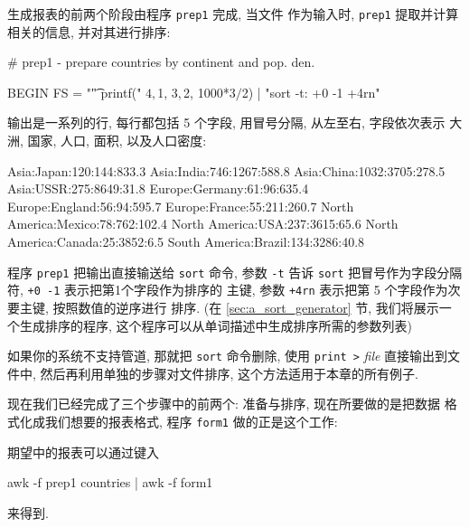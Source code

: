 生成报表的前两个阶段由程序 \verb'prep1' 完成, 当文件 
作为输入时, \verb'prep1' 提取并计算相关的信息, 并对其进行排序:
\begin{awkcode}
    # prep1 - prepare countries by continent and pop. den.

    BEGIN { FS = "\t" }
          { printf("%
                $4, $1, $3, $2, 1000*$3/$2) | "sort -t: +0 -1 +4rn"
          }
\end{awkcode}
输出是一系列的行, 每行都包括 5 个字段, 用冒号分隔, 从左至右, 字段依次表示
大洲, 国家, 人口, 面积, 以及人口密度:
\begin{shell}
    Asia:Japan:120:144:833.3
    Asia:India:746:1267:588.8
    Asia:China:1032:3705:278.5
    Asia:USSR:275:8649:31.8
    Europe:Germany:61:96:635.4
    Europe:England:56:94:595.7
    Europe:France:55:211:260.7
    North America:Mexico:78:762:102.4
    North America:USA:237:3615:65.6
    North America:Canada:25:3852:6.5
    South America:Brazil:134:3286:40.8
\end{shell}
程序 \verb'prep1' 把输出直接输送给 \verb'sort' 命令, 参数 \verb'-t' 告诉 
\verb'sort' 把冒号作为字段分隔符, \verb'+0 -1' 表示把第1个字段作为排序的
主键, 参数 \verb'+4rn' 表示把第 5 个字段作为次要主键, 按照数值的逆序进行
排序. (在 \ref{sec:a_sort_generator} 节, 我们将展示一个生成排序的程序,
这个程序可以从单词描述中生成排序所需的参数列表)

如果你的系统不支持管道, 那就把 \verb'sort' 命令删除, 使用 \verb'print >'
\textit{file} 直接输出到文件中, 然后再利用单独的步骤对文件排序,
这个方法适用于本章的所有例子.

现在我们已经完成了三个步骤中的前两个: 准备与排序, 现在所要做的是把数据
格式化成我们想要的报表格式, 程序 \verb'form1' 做的正是这个工作:
期望中的报表可以通过键入
\begin{shell}
    awk -f prep1 countries | awk -f form1
\end{shell}
来得到.

